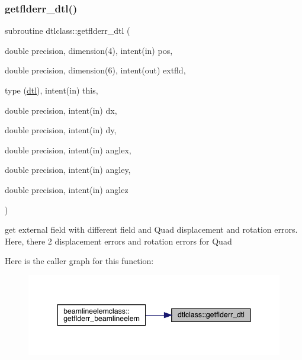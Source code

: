 \subsubsection{\texorpdfstring{getflderr\_dtl()}{getflderr\_dtl()}}
{\footnotesize\ttfamily subroutine dtlclass\+::getflderr\+\_\+dtl (\begin{DoxyParamCaption}\item[{double precision, dimension(4), intent(in)}]{pos,  }\item[{double precision, dimension(6), intent(out)}]{extfld,  }\item[{type (\mbox{\hyperlink{namespacedtlclass_structdtlclass_1_1dtl}{dtl}}), intent(in)}]{this,  }\item[{double precision, intent(in)}]{dx,  }\item[{double precision, intent(in)}]{dy,  }\item[{double precision, intent(in)}]{anglex,  }\item[{double precision, intent(in)}]{angley,  }\item[{double precision, intent(in)}]{anglez }\end{DoxyParamCaption})}



get external field with different field and Quad displacement and rotation errors. Here, there 2 displacement errors and rotation errors for Quad 

Here is the caller graph for this function\+:\nopagebreak
\begin{figure}[H]
\begin{center}
\leavevmode
\includegraphics[width=344pt]{namespacedtlclass_ab866f108c00b307f9e7a55731eadafa4_icgraph}
\end{center}
\end{figure}
\mbox{\label{namespacedtlclass_aa42e9d402234d9be025275b620c42326}} 

